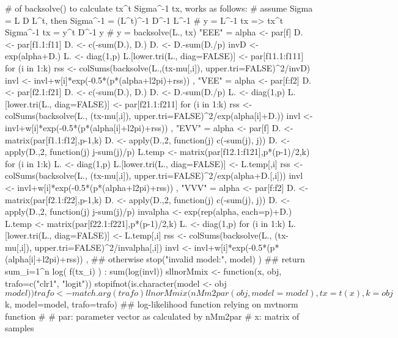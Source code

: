 \begin{Schunk}
\begin{Soutput}
{    # of backsolve() to calculate tx^t Sigma^-1 tx, works as follows:
    # assume Sigma = L D L^t, then Sigma^-1 = (L^t)^-1 D^-1 L^-1
    # y = L^-1 tx  => tx^t Sigma^-1 tx = y^t D^-1 y
    # y = backsolve(L., tx)
    "EEE" = {
        alpha <- par[f]
        D. <- par[f1.1:f11]
        D. <- c(-sum(D.), D.)
        D. <- D.-sum(D./p)
        invD <- exp(alpha+D.)
        L. <- diag(1,p)
        L.[lower.tri(L., diag=FALSE)] <- par[f11.1:f111]
        for (i in 1:k) {
            rss <- colSums(backsolve(L.,(tx-mu[,i]), upper.tri=FALSE)^2/invD)
            invl <- invl+w[i]*exp(-0.5*(p*(alpha+l2pi)+rss))
        }
    },
    "VEE" = {
        alpha <- par[f:f2]
        D. <- par[f2.1:f21]
        D. <- c(-sum(D.), D.)
        D. <- D.-sum(D./p)
        L. <- diag(1,p)
        L.[lower.tri(L., diag=FALSE)] <- par[f21.1:f211]
        for (i in 1:k) {
            rss <- colSums(backsolve(L., (tx-mu[,i]), upper.tri=FALSE)^2/exp(alpha[i]+D.))
            invl <- invl+w[i]*exp(-0.5*(p*(alpha[i]+l2pi)+rss))
        }
    },
    "EVV" = {
        alpha <- par[f]
        D. <- matrix(par[f1.1:f12],p-1,k)
        D. <- apply(D.,2, function(j) c(-sum(j), j))
        D. <- apply(D.,2, function(j) j-sum(j)/p)
        L.temp <- matrix(par[f12.1:f121],p*(p-1)/2,k)
        for (i in 1:k) {
            L. <- diag(1,p)
            L.[lower.tri(L., diag=FALSE)] <- L.temp[,i]
            rss <- colSums(backsolve(L., (tx-mu[,i]), upper.tri=FALSE)^2/exp(alpha+D.[,i]))
            invl <- invl+w[i]*exp(-0.5*(p*(alpha+l2pi)+rss))
        }
    },
    "VVV" = {
        alpha <- par[f:f2]
        D. <- matrix(par[f2.1:f22],p-1,k)
        D. <- apply(D.,2, function(j) c(-sum(j), j))
        D. <- apply(D.,2, function(j) j-sum(j)/p)
        invalpha <- exp(rep(alpha, each=p)+D.)
        L.temp <- matrix(par[f22.1:f221],p*(p-1)/2,k)
        L. <- diag(1,p)
        for (i in 1:k) {
            L.[lower.tri(L., diag=FALSE)] <- L.temp[,i]
            rss <- colSums(backsolve(L., (tx-mu[,i]), upper.tri=FALSE)^2/invalpha[,i])
            invl <- invl+w[i]*exp(-0.5*(p*(alpha[i]+l2pi)+rss))
        }
    },
    ## otherwise
    stop("invalid model:", model)
    )
    ## return  sum_{i=1}^n log( f(tx_i) ) :
    sum(log(invl))
}
sllnorMmix <- function(x, obj, trafo=c("clr1", "logit")) {
    stopifnot(is.character(model <- obj$model))
    trafo <- match.arg(trafo)
    llnorMmix(nMm2par(obj, model=model),
              tx = t(x), k = obj$k, 
              model=model, trafo=trafo)
}
## log-likelihood function relying on mvtnorm function
#
# par:   parameter vector as calculated by nMm2par
# x:     matrix of samples

\end{Soutput}
\end{Schunk}
